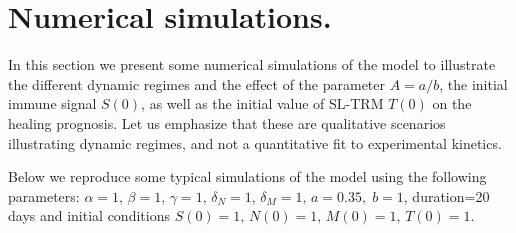 \documentclass[a4paper, 12pt]{article}
\begin{document}
\section{Numerical simulations.}\label{sec:numerical_simulations}
In this section we present some numerical simulations of the model to illustrate the different dynamic regimes and the effect of the parameter $A=a/b$, the initial immune signal $S(0)$, as well as the initial value of SL-TRM $T(0)$ on the healing prognosis.
Let us emphasize that these are qualitative scenarios illustrating dynamic regimes, and not a quantitative fit to experimental kinetics.

Below we reproduce some typical simulations of the model using the following parameters:
$\alpha=1,\, \beta=1,\, \gamma=1,\,
       \delta_N=1,\, \delta_M=1,\, a=0.35,\; b=1$,  
       duration=20 days and initial conditions $S(0)=1,\, N(0)=1,\, M(0)=1,\, T(0)=1$.
\end{document}
